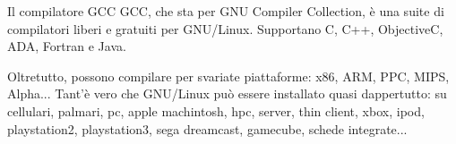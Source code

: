 \begin{slide}{Il compilatore GCC}
GCC, che sta per GNU Compiler Collection, è una suite di compilatori
liberi e gratuiti per GNU/Linux. Supportano C, C++, ObjectiveC, ADA,
Fortran e Java.

Oltretutto, possono compilare per svariate piattaforme: x86, ARM, PPC,
MIPS, Alpha... Tant'è vero che GNU/Linux può essere installato quasi
dappertutto: su cellulari, palmari, pc, apple machintosh, hpc, server,
thin client, xbox, ipod, playstation2, playstation3, sega dreamcast,
gamecube, schede integrate...

\end{slide}
